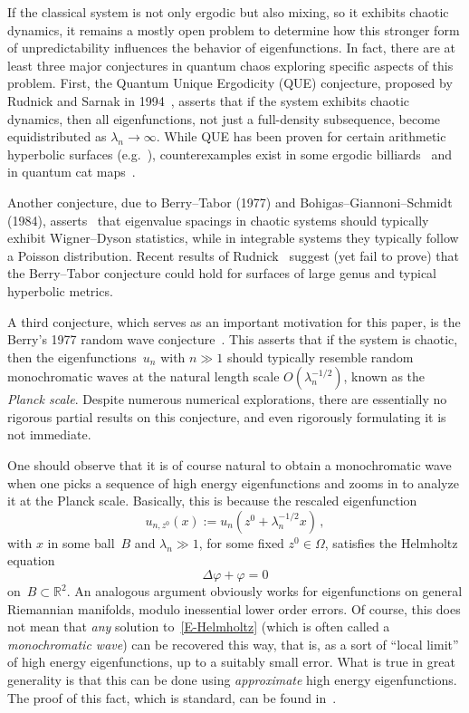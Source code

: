 \documentclass{amsart}
\theoremstyle{definition}
\theoremstyle{remark}
\newcommand{\la}{\lambda}
\newcommand{\vp}{\varphi}
\newcommand{\Om}{\Omega}
\def\RR{\mathbb{R}}
\numberwithin{equation}{section}
\theoremstyle{definition}
\theoremstyle{remark}
\def\RR{\mathbb{R}}
\begin{document}
If the classical system is not only ergodic but also mixing, so it exhibits chaotic dynamics, it remains a mostly open problem to determine how this stronger form of unpredictability influences the behavior of eigenfunctions. In fact, there are at least three major conjectures in quantum chaos exploring specific aspects of this problem. First, the Quantum Unique Ergodicity (QUE) conjecture, proposed by Rudnick and Sarnak in 1994~\cite{RudnickSarnak1994}, asserts that if the system exhibits chaotic dynamics, then all eigenfunctions, not just a full-density subsequence, become equidistributed as $\lambda_n\to\infty$. While QUE has been proven for certain arithmetic hyperbolic surfaces (e.g.\ \cite{lindenstrauss2006Invariant,silberman2007Arithmetic, holowinsky2010mass}), counterexamples exist in some ergodic billiards~\cite{Hassel} and in quantum cat maps~\cite{debievre2003scarred}.

Another conjecture, due to Berry--Tabor (1977) and  Bohigas--Giannoni--Schmidt (1984), asserts~\cite{BerryTabor1977,BohigasGiannoniSchmit1984}  that eigenvalue spacings in chaotic systems should typically exhibit Wigner--Dyson statistics, while in integrable systems they typically follow a Poisson distribution. Recent results of Rudnick~\cite{Rudnick2022} suggest (yet fail to prove) that the Berry--Tabor conjecture could hold for surfaces of large genus and typical hyperbolic metrics.

A third conjecture, which serves as an important motivation for this paper, is the Berry's 1977 random wave conjecture~\cite{Be77}. This asserts that if the system is chaotic, then the eigenfunctions~$u_n$ with $n\gg1$ should typically resemble random monochromatic waves at the natural length scale $O(\lambda_n^{-1/2})$, known as the {\em Planck scale}\/. Despite numerous numerical explorations, there are essentially no rigorous partial results on this conjecture, and even rigorously formulating it is not immediate.

One should observe that it is of course natural to obtain a monochromatic wave when one picks a sequence of high energy eigenfunctions and zooms in to analyze it at the Planck scale. Basically, this is because the rescaled eigenfunction
\begin{equation}\label{E.unz0}
	u_{n,z^0}(x):=u_n(z^0+\la_n^{-1/2}x)\,,
\end{equation}
with $x$ in some ball~$B$ and $\la_n\gg1$, for some fixed $z^0\in\Om$, satisfies the Helmholtz equation
\begin{equation} \label{E-Helmholtz}
\Delta\vp+\vp=0
\end{equation}
on~$B\subset\RR^2$. An analogous argument obviously works for eigenfunctions on general Riemannian manifolds, modulo inessential lower order errors. Of course, this does not mean that {\em any}\/ solution to~\eqref{E-Helmholtz} (which is often called a {\em monochromatic wave}\/) can be recovered this way, that is, as a sort of ``local limit'' of high energy eigenfunctions, up to a suitably small error. What is true in great generality is that this can be done using {\em approximate}\/ high energy eigenfunctions. The proof of this fact, which is standard, can be found in~\cite[Appendix~A]{ILtori}.
\end{document}
